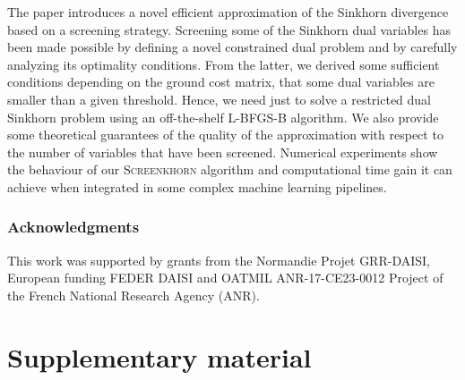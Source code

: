 \documentclass{article}
\begin{document}
The paper introduces a novel efficient approximation of the Sinkhorn divergence
based on a screening strategy. Screening some of the Sinkhorn dual variables
has been made possible by defining a novel constrained dual problem and by 
carefully analyzing its optimality conditions. From the latter, we derived some
sufficient conditions depending on the ground cost matrix, that some dual variables are smaller than a given threshold. Hence, we need just to solve a restricted
dual Sinkhorn problem using an off-the-shelf L-BFGS-B algorithm. We also provide
some theoretical guarantees of the quality of the approximation with respect to
the number of variables that have been screened. Numerical experiments show 
the behaviour of our \textsc{Screenkhorn} algorithm and computational time gain it can
achieve when integrated in some complex machine learning pipelines.

\subsubsection*{Acknowledgments}

This work was supported by grants from the Normandie Projet GRR-DAISI, European funding FEDER DAISI and OATMIL ANR-17-CE23-0012 Project of the French National Research Agency (ANR).

\small



\newpage
\section{Supplementary material}

\end{document}
